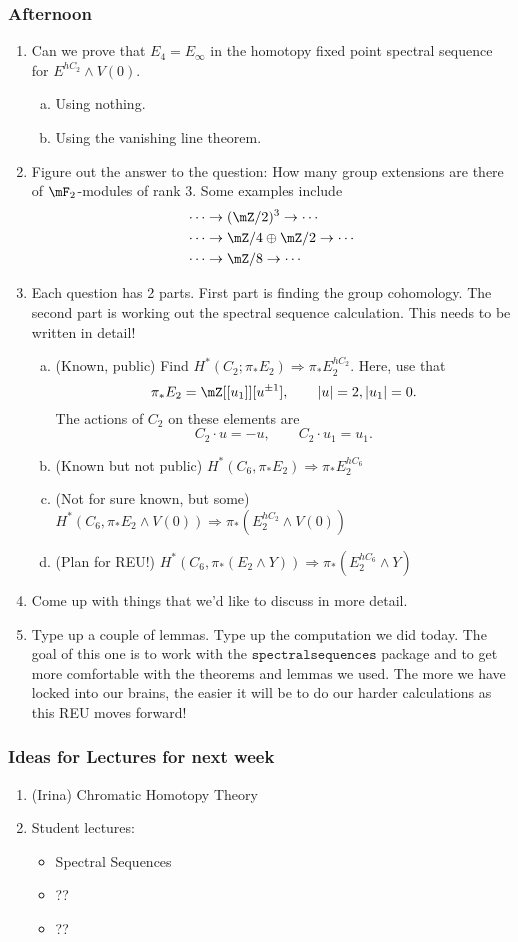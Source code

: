 \subsubsection{Afternoon}
\begin{enumerate}
    \item Can we prove that $E_4 = E_\infty$ in the homotopy fixed point spectral sequence for $E^{hC_2}\wedge V(0)$. 
    \begin{enumerate}[a.]
        \item Using nothing. 
        \item Using the vanishing line theorem. 
    \end{enumerate}
    \item Figure out the answer to the question: How many group extensions are there of $\mF_2$-modules of rank 3. Some examples include 
    \begin{align*}
        \cdots & \to (\mZ/2)^3\to \cdots\\
        \cdots & \to \mZ/4\oplus \mZ/2 \to \cdots\\
        \cdots & \to \mZ/8\to \cdots
    \end{align*}
    \item Each question has 2 parts. First part is finding the group cohomology. The second part is working out the spectral sequence calculation. This needs to be written in detail!
    \begin{enumerate}[a.]
        \item (Known, public) Find $H^\ast(C_2;\pi_\ast E_2)\Rightarrow \pi_\ast E_2^{hC_2}$. Here, use that $$\pi_\ast E_2 = \mZ[[u_1]][u^{\pm 1}], \qquad \abs{u}=2, \abs{u_1}=0.$$ The actions of $C_2$ on these elements are $$C_2\cdot u = -u, \qquad C_2\cdot u_1 = u_1.$$ 
        \item (Known but not public) $H^\ast(C_6, \pi_\ast E_2)\Rightarrow \pi_\ast E_2^{hC_6}$
        \item (Not for sure known, but some) $H^\ast(C_6,\pi_\ast E_2\wedge V(0))\Rightarrow \pi_\ast(E_2^{hC_2}\wedge V(0))$
        \item (Plan for REU!) $H^\ast(C_6,\pi_\ast(E_2\wedge Y))\Rightarrow \pi_\ast(E_2^{hC_6}\wedge Y)$
    \end{enumerate}
    
    \item Come up with things that we'd like to discuss in more detail. 
    \item Type up a couple of lemmas. Type up the computation we did today. The goal of this one is to work with the $\texttt{spectralsequences}$ package and to get more comfortable with the theorems and lemmas we used. The more we have locked into our brains, the easier it will be to do our harder calculations as this REU moves forward! 
\end{enumerate}
\subsubsection{Ideas for Lectures for next week}
\begin{enumerate}
    \item (Irina) Chromatic Homotopy Theory
    \item Student lectures: 
    \begin{itemize}
        \item Spectral Sequences
        \item ??
        \item ??
    \end{itemize}
\end{enumerate}
